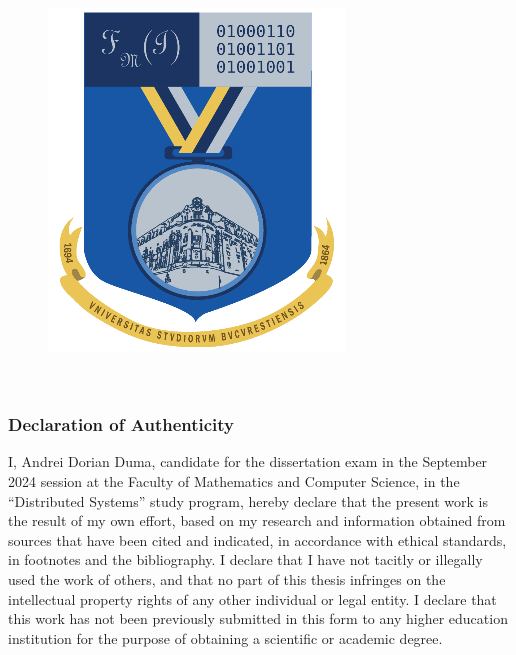 \documentclass[a4paper,12pt,final]{article}
\begin{document}
\begin{figure}[!htb]
\begin{minipage}{0.6\textwidth}
    \end{minipage}
    \begin{minipage}{0.175\textwidth}
        \includegraphics[width=\linewidth]{img/logo-fmi.png}
    \end{minipage}

    \vspace{4cm} %
    \maketitle
\end{figure}

\clearpage \ \clearpage


\vspace*{\fill}

\subsubsection*{Declaration of Authenticity}
I, Andrei Dorian Duma, candidate for the dissertation exam in the
September 2024 session at the Faculty of Mathematics and Computer
Science, in the “Distributed Systems” study program, hereby declare
that the present work is the result of my own effort, based on my
research and information obtained from sources that have been cited
and indicated, in accordance with ethical standards, in footnotes and
the bibliography. I declare that I have not tacitly or illegally used
the work of others, and that no part of this thesis infringes on the
intellectual property rights of any other individual or legal
entity. I declare that this work has not been previously submitted in
this form to any higher education institution for the purpose of
obtaining a scientific or academic degree.
\end{document}
